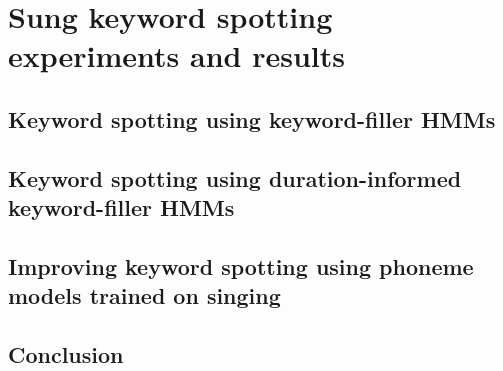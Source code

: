 \chapter{Sung keyword spotting experiments and results} \label{chap:kws}
\section{Keyword spotting using keyword-filler HMMs}

\section{Keyword spotting using duration-informed keyword-filler HMMs}

\section{Improving keyword spotting using phoneme models trained on singing}


\section{Conclusion}